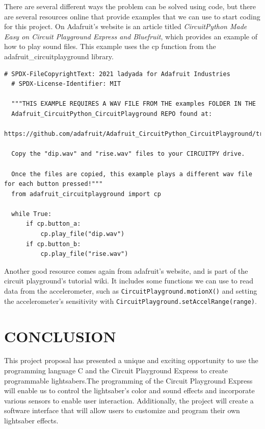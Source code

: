 \documentclass[12pt]{article}
\begin{document}
There are several different ways the problem can be solved using code, but there are several resources online that provide examples that we can use to start coding for this project. On Adafruit's website is an article titled \emph{CircuitPython Made Easy on Circuit Playground Express and Bluefruit}, which provides an example of how to play sound files. This example uses the cp function from the adafruit\_circuitplayground library. \cite{adafruitPlayfile} 

\begin{lstlisting}[language=Arduino]
  # SPDX-FileCopyrightText: 2021 ladyada for Adafruit Industries
  # SPDX-License-Identifier: MIT
  
  """THIS EXAMPLE REQUIRES A WAV FILE FROM THE examples FOLDER IN THE
  Adafruit_CircuitPython_CircuitPlayground REPO found at:
  https://github.com/adafruit/Adafruit_CircuitPython_CircuitPlayground/tree/main/examples
  
  Copy the "dip.wav" and "rise.wav" files to your CIRCUITPY drive.
  
  Once the files are copied, this example plays a different wav file for each button pressed!"""
  from adafruit_circuitplayground import cp
  
  while True:
      if cp.button_a:
          cp.play_file("dip.wav")
      if cp.button_b:
          cp.play_file("rise.wav")
\end{lstlisting}

Another good resource comes again from adafruit's website, and is part of the circuit playground's tutorial wiki. It includes some functions we can use to read data from the accelerometer, such as \lstinline{CircuitPlayground.motionX()} and setting the accelerometer's sensitivity with \lstinline{CircuitPlayground.setAccelRange(range)}. \cite{adafruitAccelerometer}

\section{CONCLUSION}
This project proposal has presented a unique and exciting opportunity to use the programming language C and the Circuit Playground Express to create programmable lightsabers.The programming of the Circuit Playground Express will enable us to control the lightsaber's color and sound effects and incorporate various sensors to enable user interaction. Additionally, the project will create a software interface that will allow users to customize and program their own lightsaber effects.
\end{document}
